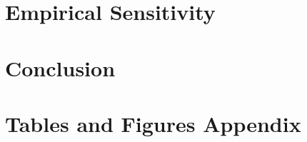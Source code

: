 \documentclass[12pt]{article}
\begin{document}
\section{Empirical Sensitivity \label{sec:esens}}


\section{Conclusion \label{sec:conclusion}}


\clearpage
\singlespacing




\newpage
\appendix
\section*{Tables and Figures Appendix}
\FloatBarrier


\end{document}
